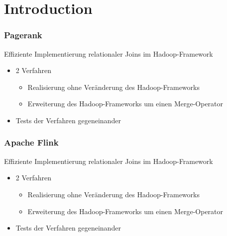 \section{Introduction}

\begin{frame}
\frametitle{Pagerank}
Effiziente Implementierung relationaler Joins im Hadoop-Framework
\hspace{8pt}
\begin{itemize}
  \item 2 Verfahren
  \begin{itemize}
    \item Realisierung ohne Veränderung des Hadoop-Frameworks
    \item Erweiterung des Hadoop-Frameworks um einen
    Merge-Operator
  \end{itemize}
  \item Tests der Verfahren gegeneinander
\end{itemize}
\end{frame}

\begin{frame}
\frametitle{Apache Flink}
Effiziente Implementierung relationaler Joins im Hadoop-Framework
\hspace{8pt}
\begin{itemize}
  \item 2 Verfahren
  \begin{itemize}
    \item Realisierung ohne Veränderung des Hadoop-Frameworks
    \item Erweiterung des Hadoop-Frameworks um einen
    Merge-Operator
  \end{itemize}
  \item Tests der Verfahren gegeneinander
\end{itemize}
\end{frame}
